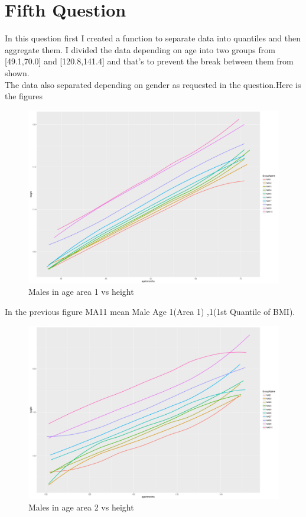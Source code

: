\documentclass{article}
\begin{document}
	\section*{Fifth Question}
In this question first I created a function to separate data into quantiles and then aggregate them.
I divided the data depending on age into two groups from [49.1,70.0] and [120.8,141.4] and that's to prevent the break between them from shown.\\
The data also separated depending on gender as requested in the question.Here is the figures
\begin{figure}[H]
\begin{center}
\includegraphics[scale = 0.4]{maleage1.png}
\end{center}
\caption{Males in age area 1 vs height}
\end{figure} 
In the previous figure MA11 mean Male Age 1(Area 1) ,1(1st Quantile of BMI).
\begin{figure}[H]
	\begin{center}
		\includegraphics[scale = 0.4]{maleage2.png}
	\end{center}
	\caption{Males in age area 2 vs height}
\end{figure} 
\end{document}
